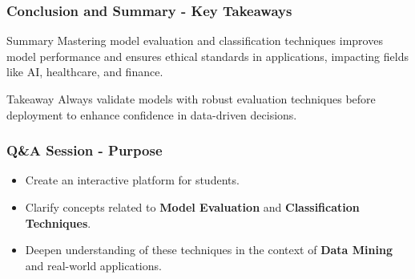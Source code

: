 \documentclass[aspectratio=169]{beamer}
\begin{document}
\begin{frame}[fragile]
    \frametitle{Conclusion and Summary - Key Takeaways}
    \begin{block}{Summary}
        Mastering model evaluation and classification techniques improves model performance and ensures ethical standards in applications, impacting fields like AI, healthcare, and finance.
    \end{block}
    \begin{block}{Takeaway}
        Always validate models with robust evaluation techniques before deployment to enhance confidence in data-driven decisions.
    \end{block}
\end{frame}

\begin{frame}[fragile]
    \frametitle{Q\&A Session - Purpose}
    \begin{itemize}
        \item Create an interactive platform for students.
        \item Clarify concepts related to \textbf{Model Evaluation} and \textbf{Classification Techniques}.
        \item Deepen understanding of these techniques in the context of \textbf{Data Mining} and real-world applications.
    \end{itemize}
\end{frame}
\end{document}
